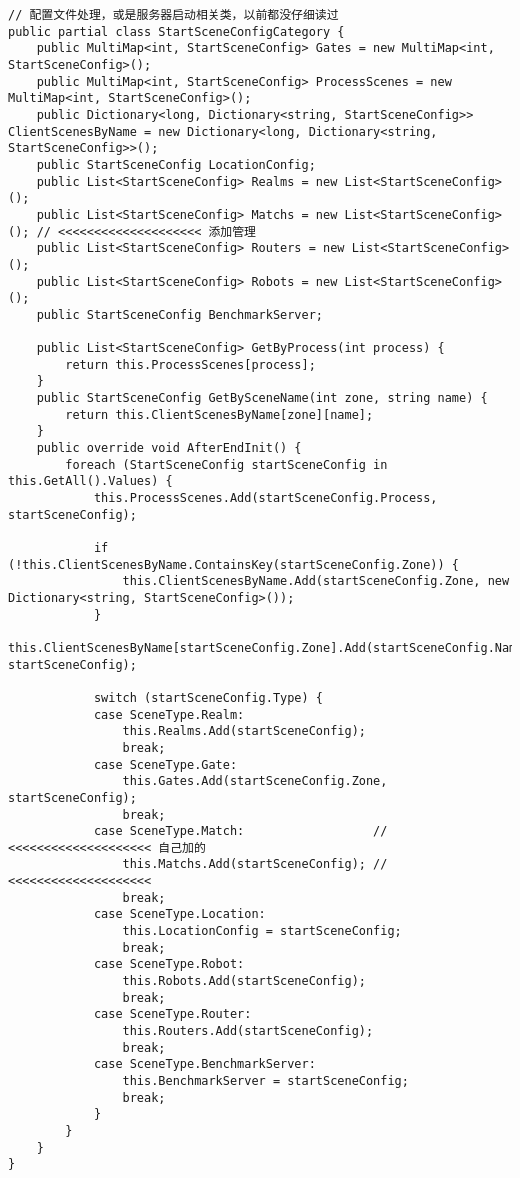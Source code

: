 \documentclass[9pt, b5paper]{article}
\begin{document}
\begin{verbatim}
// 配置文件处理，或是服务器启动相关类，以前都没仔细读过
public partial class StartSceneConfigCategory {
    public MultiMap<int, StartSceneConfig> Gates = new MultiMap<int, StartSceneConfig>();
    public MultiMap<int, StartSceneConfig> ProcessScenes = new MultiMap<int, StartSceneConfig>();
    public Dictionary<long, Dictionary<string, StartSceneConfig>> ClientScenesByName = new Dictionary<long, Dictionary<string, StartSceneConfig>>();
    public StartSceneConfig LocationConfig;
    public List<StartSceneConfig> Realms = new List<StartSceneConfig>();
    public List<StartSceneConfig> Matchs = new List<StartSceneConfig>(); // <<<<<<<<<<<<<<<<<<<< 添加管理
    public List<StartSceneConfig> Routers = new List<StartSceneConfig>();
    public List<StartSceneConfig> Robots = new List<StartSceneConfig>();
    public StartSceneConfig BenchmarkServer;

    public List<StartSceneConfig> GetByProcess(int process) {
        return this.ProcessScenes[process];
    }
    public StartSceneConfig GetBySceneName(int zone, string name) {
        return this.ClientScenesByName[zone][name];
    }
    public override void AfterEndInit() {
        foreach (StartSceneConfig startSceneConfig in this.GetAll().Values) {
            this.ProcessScenes.Add(startSceneConfig.Process, startSceneConfig);
                
            if (!this.ClientScenesByName.ContainsKey(startSceneConfig.Zone)) {
                this.ClientScenesByName.Add(startSceneConfig.Zone, new Dictionary<string, StartSceneConfig>());
            }
            this.ClientScenesByName[startSceneConfig.Zone].Add(startSceneConfig.Name, startSceneConfig);
                
            switch (startSceneConfig.Type) {
            case SceneType.Realm:
                this.Realms.Add(startSceneConfig);
                break;
            case SceneType.Gate:
                this.Gates.Add(startSceneConfig.Zone, startSceneConfig);
                break;
            case SceneType.Match:                  // <<<<<<<<<<<<<<<<<<<< 自己加的
                this.Matchs.Add(startSceneConfig); // <<<<<<<<<<<<<<<<<<<< 
                break;
            case SceneType.Location:
                this.LocationConfig = startSceneConfig;
                break;
            case SceneType.Robot:
                this.Robots.Add(startSceneConfig);
                break;
            case SceneType.Router:
                this.Routers.Add(startSceneConfig);
                break;
            case SceneType.BenchmarkServer:
                this.BenchmarkServer = startSceneConfig;
                break;
            }
        }
    }
}
\end{verbatim}
\end{document}
